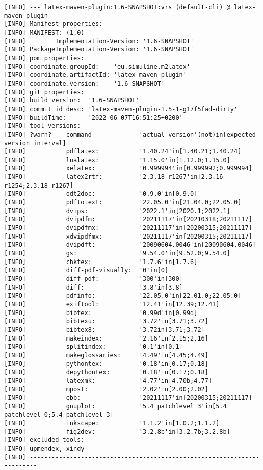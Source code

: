 \begin{lstlisting}[basicstyle=\tiny,
float, captionpos=b, label={lst:vrsOut}, 
caption={Output of goal \texttt{latex:vrs}}]
[INFO] --- latex-maven-plugin:1.6-SNAPSHOT:vrs (default-cli) @ latex-maven-plugin ---
[INFO] Manifest properties: 
[INFO] MANIFEST: (1.0)
[INFO]        Implementation-Version: '1.6-SNAPSHOT'
[INFO] PackageImplementation-Version: '1.6-SNAPSHOT'
[INFO] pom properties:
[INFO] coordinate.groupId:    'eu.simuline.m2latex'
[INFO] coordinate.artifactId: 'latex-maven-plugin'
[INFO] coordinate.version:    '1.6-SNAPSHOT'
[INFO] git properties: 
[INFO] build version:  '1.6-SNAPSHOT'
[INFO] commit id desc: 'latex-maven-plugin-1.5-1-g17f5fad-dirty'
[INFO] buildTime:      '2022-06-07T16:51:25+0200'
[INFO] tool versions: 
[INFO] ?warn?    command             'actual version'(not)in[expected version interval]
[INFO]           pdflatex:           '1.40.24'in[1.40.21;1.40.24]
[INFO]           lualatex:           '1.15.0'in[1.12.0;1.15.0]
[INFO]           xelatex:            '0.999994'in[0.999992;0.999994]
[INFO]           latex2rtf:          '2.3.18 r1267'in[2.3.16 r1254;2.3.18 r1267]
[INFO]           odt2doc:            '0.9.0'in[0.9.0]
[INFO]           pdftotext:          '22.05.0'in[21.04.0;22.05.0]
[INFO]           dvips:              '2022.1'in[2020.1;2022.1]
[INFO]           dvipdfm:            '20211117'in[20210318;20211117]
[INFO]           dvipdfmx:           '20211117'in[20200315;20211117]
[INFO]           xdvipdfmx:          '20211117'in[20200315;20211117]
[INFO]           dvipdft:            '20090604.0046'in[20090604.0046]
[INFO]           gs:                 '9.54.0'in[9.52.0;9.54.0]
[INFO]           chktex:             '1.7.6'in[1.7.6]
[INFO]           diff-pdf-visually:  '0'in[0]
[INFO]           diff-pdf:           '300'in[300]
[INFO]           diff:               '3.8'in[3.8]
[INFO]           pdfinfo:            '22.05.0'in[22.01.0;22.05.0]
[INFO]           exiftool:           '12.41'in[12.39;12.41]
[INFO]           bibtex:             '0.99d'in[0.99d]
[INFO]           bibtexu:            '3.72'in[3.71;3.72]
[INFO]           bibtex8:            '3.72in[3.71;3.72]
[INFO]           makeindex:          '2.16'in[2.15;2.16]
[INFO]           splitindex:         '0.1'in[0.1]
[INFO]           makeglossaries:     '4.49'in[4.45;4.49]
[INFO]           pythontex:          '0.18'in[0.17;0.18]
[INFO]           depythontex:        '0.18'in[0.17;0.18]
[INFO]           latexmk:            '4.77'in[4.70b;4.77]
[INFO]           mpost:              '2.02'in[2.00;2.02]
[INFO]           ebb:                '20211117'in[20200315;20211117]
[INFO]           gnuplot:            '5.4 patchlevel 3'in[5.4 patchlevel 0;5.4 patchlevel 3]
[INFO]           inkscape:           '1.1.2'in[1.0.2;1.1.2]
[INFO]           fig2dev:            '3.2.8b'in[3.2.7b;3.2.8b]
[INFO] excluded tools: 
[INFO] upmendex, xindy
[INFO] ------------------------------------------------------------------------
\end{lstlisting}



